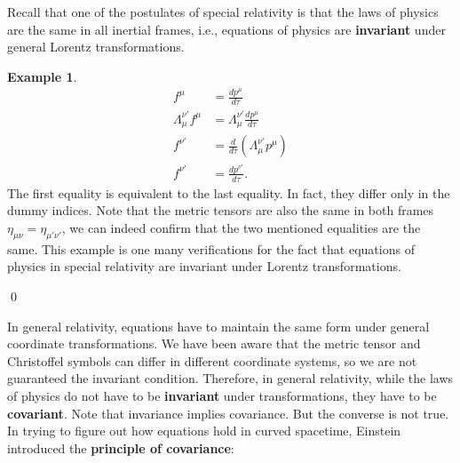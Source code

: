 \documentclass{book}
\theoremstyle{definition}
\newtheorem{exmp}{Example}[section]
\begin{document}
Recall that one of the postulates of special relativity is that the laws of physics are the same in all inertial frames, i.e., equations of physics are \textbf{invariant} under general Lorentz transformations.\\
\begin{exmp}
	\begin{align*}
	f^\mu &= \frac{dp^\mu}{d\tau}\\
	\Lambda^{\nu'}_{\mu}f^\mu &= \Lambda^{\nu'}_\mu\frac{dp^\mu}{d\tau} \\
	f^{\nu'} &= \frac{d}{d\tau}\left(\Lambda^{\nu'}_\mu p^\mu \right) \\
	f^{\nu'} &= \frac{dp^{\nu'}}{d\tau}.
	\end{align*}
	The first equality is equivalent to the last equality. In fact, they differ only in the dummy indices. Note that the metric tensors are also the same in both frames $\eta_{\mu\nu} = \eta_{\mu'\nu'}$, we can indeed confirm that the two mentioned equalities are the same. This example is one many verifications for the fact that equations of physics in special relativity are invariant under Lorentz transformations.\\
\end{exmp}\qed

In general relativity, equations have to maintain the same form under general coordinate transformations. We have been aware that the metric tensor and Christoffel symbols can differ in different coordinate systems, so we are not guaranteed the invariant condition. Therefore, in general relativity, while the laws of physics do not have to be \textbf{invariant} under transformations, they have to be \textbf{covariant}. Note that invariance implies covariance. But the converse is not true.\\

In trying to figure out how equations hold in curved spacetime, Einstein introduced the \textbf{principle of covariance}:\\

\\\\
\end{document}
